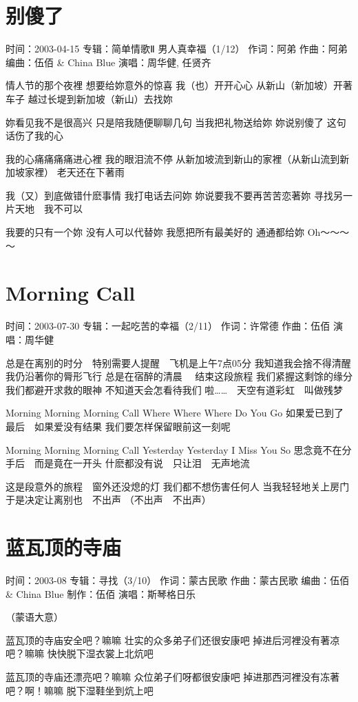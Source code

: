 \documentclass[UTF8,a4paper,oneside,twocolumn,12pt]{ctexbook}
\newcommand{\infopair}[2]{\textbullet #1：#2}
\newcommand{\zc}[1][伍佰]{\infopair{作词}{#1}}
\newcommand{\zq}[1][伍佰]{\infopair{作曲}{#1}}
\newcommand{\bq}[1][伍佰]{\infopair{编曲}{#1}}
\newcommand{\zj}[1]{\infopair{专辑}{#1}}
\newcommand{\zz}[1]{\infopair{制作}{#1}}
\newcommand{\sj}[1]{\infopair{时间}{#1}}
\newenvironment{info}{\begin{flushleft}\kaishu
	}
	{\end{flushleft}\normalsize\yahei\par}
\newenvironment{lyric}{
	}
{}
\begin{document}
\section{别傻了}
\begin{info}
	\sj{2003-04-15}
	\zj{简单情歌Ⅱ 男人真幸福（1/12）}
	\zc[阿弟]
	\zq[阿弟]
	\bq[伍佰 \& China Blue]
	\infopair{演唱}{周华健, 任贤齐}
\end{info}
\begin{lyric}
	情人节的那个夜裡
	想要给妳意外的惊喜
	我（也）开开心心 从新山（新加坡）开著车子
	越过长堤到新加坡（新山）去找妳

	妳看见我不是很高兴
	只是陪我随便聊聊几句
	当我把礼物送给妳
	妳说别傻了
	这句话伤了我的心

	我的心痛痛痛痛进心裡
	我的眼泪流不停
	从新加坡流到新山的家裡（从新山流到新加坡家裡）
	老天还在下著雨

	我（又）到底做错什麽事情
	我打电话去问妳
	妳说要我不要再苦苦恋著妳
	寻找另一片天地　我不可以

	我要的只有一个妳 没有人可以代替妳
	我愿把所有最美好的 通通都给妳
	Oh～～～～
\end{lyric}

\section{Morning Call}
\begin{info}
	\sj{2003-07-30}
	\zj{一起吃苦的幸福（2/11）}
	\zc[许常德]
	\zq
	\infopair{演唱}{周华健}
\end{info}
\begin{lyric}
	总是在离别的时分　特别需要人提醒　飞机是上午7点05分
	我知道我会捨不得清醒　我仍沿著你的脣形飞行
	总是在宿醉的清晨 　结束这段旅程
	我们紧握这剩馀的缘分　我们都避开求救的眼神
	不知道天会怎看待我们
	啦……　天空有道彩虹　叫做残梦

	Morning Morning Morning Call
	Where Where Where Do You Go
	如果爱已到了最后　如果爱没有结果
	我们要怎样保留眼前这一刻呢

	Morning Morning Morning Call
	Yesterday Yesterday I Miss You So
	思念竟不在分手后　而是竟在一开头
	什麽都没有说　只让泪　无声地流

	这是段意外的旅程　窗外还没熄的灯
	我们都不想伤害任何人
	当我轻轻地关上房门　于是决定让离别也　不出声
	（不出声　不出声）
\end{lyric}

\section{蓝瓦顶的寺庙}
\begin{info}
	\sj{2003-08}
	\zj{寻找（3/10）}
	\zc[蒙古民歌]
	\zq[蒙古民歌]
	\bq[伍佰 \& China Blue]
	\zz{伍佰}
	\infopair{演唱}{斯琴格日乐}
\end{info}
\begin{lyric}
	（蒙语大意）

	蓝瓦顶的寺庙安全吧？嘛嘛
	壮实的众多弟子们还很安康吧
	掉进后河裡没有著凉吧？嘛嘛
	快快脱下湿衣裳上北炕吧

	蓝瓦顶的寺庙还漂亮吧？嘛嘛
	众位弟子们呀都很安康吧
	掉进那西河裡没有冻著吧？啊！嘛嘛
	脱下湿鞋坐到炕上吧
\end{lyric}
\end{document}
